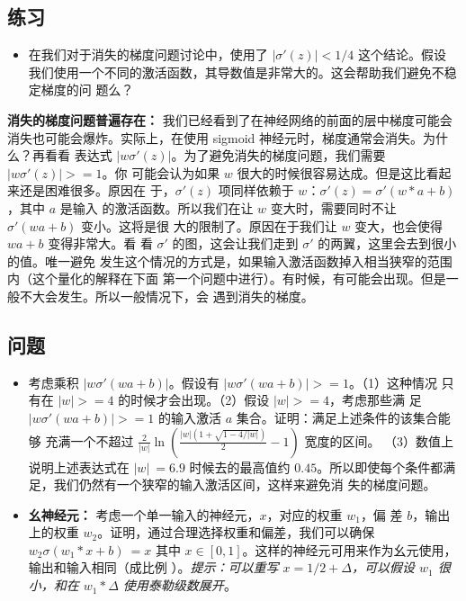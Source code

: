 \subsection*{练习}

\begin{itemize}
\item 在我们对于消失的梯度问题讨论中，使用了 $|\sigma'(z)| < 1/4$ 这个结论。假设
  我们使用一个不同的激活函数，其导数值是非常大的。这会帮助我们避免不稳定梯度的问
  题么？
\end{itemize}
 
\textbf{消失的梯度问题普遍存在：} 我们已经看到了在神经网络的前面的层中梯度可能会
消失也可能会爆炸。实际上，在使用 sigmoid 神经元时，梯度通常会消失。为什么？再看看
表达式 $|w\sigma'(z)|$。为了避免消失的梯度问题，我们需要 $|w\sigma'(z)| >= 1$。你
可能会认为如果 $w$ 很大的时候很容易达成。但是这比看起来还是困难很多。原因在
于，$\sigma'(z)$ 项同样依赖于 $w$：$\sigma'(z) = \sigma'(w*a+b)$，其中 $a$ 是输入
的激活函数。所以我们在让 $w$ 变大时，需要同时不让 $\sigma'(wa+b)$ 变小。这将是很
大的限制了。原因在于我们让 $w$ 变大，也会使得 $wa + b$ 变得非常大。看
看 $\sigma'$ 的图，这会让我们走到 $\sigma'$ 的两翼，这里会去到很小的值。唯一避免
发生这个情况的方式是，如果输入激活函数掉入相当狭窄的范围内（这个量化的解释在下面
第一个问题中进行）。有时候，有可能会出现。但是一般不大会发生。所以一般情况下，会
遇到消失的梯度。

\subsection*{问题}

\begin{itemize}
\item 考虑乘积 $|w\sigma'(wa+b)|$。假设有 $|w\sigma'(wa+b)| >= 1$。（1）这种情况
  只有在 $|w| >= 4$ 的时候才会出现。（2）假设 $|w| >= 4$，考虑那些满
  足 $|w\sigma'(wa+b)| >= 1$ 的输入激活 $a$ 集合。证明：满足上述条件的该集合能够
  充满一个不超过 $\frac{2}{|w|}\ln(\frac{|w|(1+\sqrt{1-4/|w|})}{2}-1)$ 宽度的区间。
  （3）数值上说明上述表达式在 $|w| ~= 6.9$ 时候去的最高值约
  $0.45$。所以即使每个条件都满足，我们仍然有一个狭窄的输入激活区间，这样来避免消
  失的梯度问题。
\item \textbf{幺神经元：} 考虑一个单一输入的神经元，$x$，对应的权重 $w_1$，偏
  差 $b$，输出上的权重 $w_2$。证明，通过合理选择权重和偏差，我们可以确保 $w_2
  \sigma(w_1*x +b)~=x$ 其中
  $x \in [0, 1]$。这样的神经元可用来作为幺元使用，输出和输入相同（成比例
  ）。\emph{提示：可以重写 $x = 1/2 + \Delta$，可以假设 $w_1$ 很小，和在 $w_1 *
    \Delta$ 使用泰勒级数展开}。
\end{itemize}

